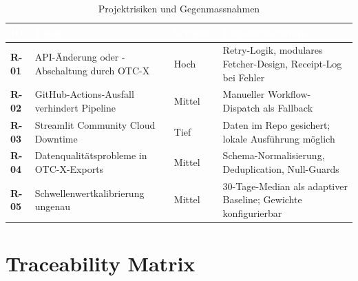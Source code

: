 \documentclass[11pt, a4paper, oneside, openany]{report}
\begin{document}
\begin{table}[H]
\centering
\caption{Projektrisiken und Gegenmassnahmen}
\label{tab:risiken}
\sffamily\small
\begin{tabularx}{\textwidth}{>{\bfseries\sffamily}l X l X}
  \toprule
  \rowcolor{DeepNavy} \textcolor{white}{\textbf{ID}} & \textcolor{white}{\textbf{Risiko}} & \textcolor{white}{\textbf{Schwere}} & \textcolor{white}{\textbf{Gegenmassnahme}} \\
  \midrule
  R-01 & API-Änderung oder -Abschaltung durch OTC-X  & Hoch   & Retry-Logik, modulares Fetcher-Design, Receipt-Log bei Fehler \\
  R-02 & GitHub-Actions-Ausfall verhindert Pipeline    & Mittel & Manueller Workflow-Dispatch als Fallback \\
  R-03 & Streamlit Community Cloud Downtime             & Tief   & Daten im Repo gesichert; lokale Ausführung möglich \\
  R-04 & Datenqualitätsprobleme in OTC-X-Exports        & Mittel & Schema-Normalisierung, Deduplication, Null-Guards \\
  R-05 & Schwellenwertkalibrierung ungenau               & Mittel & 30-Tage-Median als adaptiver Baseline; Gewichte konfigurierbar \\
  \bottomrule
\end{tabularx}
\end{table}

\section{Traceability Matrix}
\label{sec:traceability}
\end{document}
